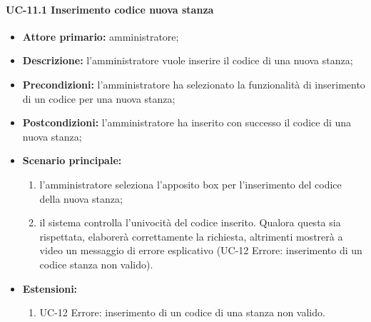 \paragraph{UC-11.1 Inserimento codice nuova stanza}
   \begin{itemize}
	\item \textbf{Attore primario:} amministratore;
	\item \textbf{Descrizione:} l'amministratore vuole inserire il codice di una nuova stanza;
	\item \textbf{Precondizioni:} l'amministratore ha selezionato la funzionalità di inserimento di un codice per una nuova stanza;
	\item \textbf{Postcondizioni:} l'amministratore ha inserito con successo il codice di una nuova stanza;
	\item \textbf{Scenario principale:}
	      \begin{enumerate}
		      \item l'amministratore seleziona l'apposito box per l'inserimento del codice della nuova stanza;
		      \item il sistema controlla l'univocità del codice inserito. Qualora questa sia rispettata, elaborerà correttamente la richiesta, altrimenti mostrerà a video un messaggio di errore esplicativo (UC-12 Errore: inserimento di un codice stanza non valido).
	      \end{enumerate}
	\item \textbf{Estensioni:}
		\begin{enumerate}
		      \item UC-12 Errore: inserimento di un codice di una stanza non valido.
	      \end{enumerate}
\end{itemize}


